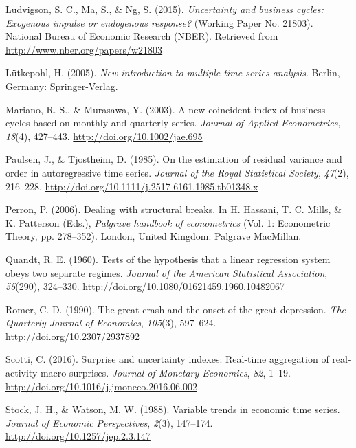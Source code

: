 \documentclass[12pt,twoside]{reedthesis}
\begin{document}
\leavevmode\hypertarget{ref-ludvetal:2015}{}%
Ludvigson, S. C., Ma, S., \& Ng, S. (2015). \emph{Uncertainty and business cycles: Exogenous impulse or endogenous response?} (Working Paper No. 21803). National Bureau of Economic Research (NBER). Retrieved from \url{http://www.nber.org/papers/w21803}

\leavevmode\hypertarget{ref-lutkepohl:2005}{}%
Lütkepohl, H. (2005). \emph{New introduction to multiple time series analysis}. Berlin, Germany: Springer-Verlag.

\leavevmode\hypertarget{ref-marimura:2003}{}%
Mariano, R. S., \& Murasawa, Y. (2003). A new coincident index of business cycles based on monthly and quarterly series. \emph{Journal of Applied Econometrics}, \emph{18}(4), 427--443. \url{http://doi.org/10.1002/jae.695}

\leavevmode\hypertarget{ref-paultjos:1985}{}%
Paulsen, J., \& Tjostheim, D. (1985). On the estimation of residual variance and order in autoregressive time series. \emph{Journal of the Royal Statistical Society}, \emph{47}(2), 216--228. \url{http://doi.org/10.1111/j.2517-6161.1985.tb01348.x}

\leavevmode\hypertarget{ref-perron:2006}{}%
Perron, P. (2006). Dealing with structural breaks. In H. Hassani, T. C. Mills, \& K. Patterson (Eds.), \emph{Palgrave handbook of econometrics} (Vol. 1: Econometric Theory, pp. 278--352). London, United Kingdom: Palgrave MacMillan.

\leavevmode\hypertarget{ref-quandt:1960}{}%
Quandt, R. E. (1960). Tests of the hypothesis that a linear regression system obeys two separate regimes. \emph{Journal of the American Statistical Association}, \emph{55}(290), 324--330. \url{http://doi.org/10.1080/01621459.1960.10482067}

\leavevmode\hypertarget{ref-romer:1990}{}%
Romer, C. D. (1990). The great crash and the onset of the great depression. \emph{The Quarterly Journal of Economics}, \emph{105}(3), 597--624. \url{http://doi.org/10.2307/2937892}

\leavevmode\hypertarget{ref-scotti:2016}{}%
Scotti, C. (2016). Surprise and uncertainty indexes: Real-time aggregation of real-activity macro-surprises. \emph{Journal of Monetary Economics}, \emph{82}, 1--19. \url{http://doi.org/10.1016/j.jmoneco.2016.06.002}

\leavevmode\hypertarget{ref-stocwats:1988}{}%
Stock, J. H., \& Watson, M. W. (1988). Variable trends in economic time series. \emph{Journal of Economic Perspectives}, \emph{2}(3), 147--174. \url{http://doi.org/10.1257/jep.2.3.147}
\end{document}
